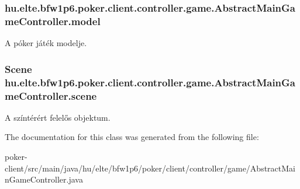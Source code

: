 \subsubsection[{model}]{ hu.\+elte.\+bfw1p6.\+poker.\+client.\+controller.\+game.\+Abstract\+Main\+Game\+Controller.\+model\hspace{0.3cm}{\ttfamily [protected]}}\label{classhu_1_1elte_1_1bfw1p6_1_1poker_1_1client_1_1controller_1_1game_1_1_abstract_main_game_controller_a471259441c4fc27e196e69ca7211ac2a}
A póker játék modelje. \hypertarget{classhu_1_1elte_1_1bfw1p6_1_1poker_1_1client_1_1controller_1_1game_1_1_abstract_main_game_controller_a16570090eca4d56c2afd1d6706afdc0d}{}
\subsubsection[{scene}]{\setlength{\rightskip}{0pt plus 5cm}Scene hu.\+elte.\+bfw1p6.\+poker.\+client.\+controller.\+game.\+Abstract\+Main\+Game\+Controller.\+scene\hspace{0.3cm}{\ttfamily [protected]}}\label{classhu_1_1elte_1_1bfw1p6_1_1poker_1_1client_1_1controller_1_1game_1_1_abstract_main_game_controller_a16570090eca4d56c2afd1d6706afdc0d}
A színtérért felelős objektum. 

The documentation for this class was generated from the following file\+:\begin{DoxyCompactItemize}
\item 
poker-\/client/src/main/java/hu/elte/bfw1p6/poker/client/controller/game/Abstract\+Main\+Game\+Controller.\+java\end{DoxyCompactItemize}
